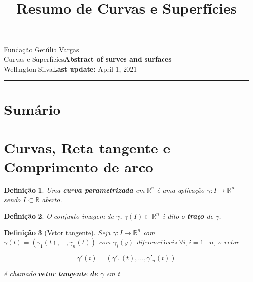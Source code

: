 \documentclass{article}
\title{Resumo de Curvas e Superfícies}
\author{}
\date{}
\newtheorem{definition}{Definição}
\newcommand{\assignment}{Abstract of surves and surfaces}
\newcommand{\duedate}{April 1, 2021}
\begin{document}
Fundação Getúlio Vargas\hfill\\
Curvas e Superfícies\hfill\textbf{\assignment}\\
Wellington Silva\hfill\textbf{Last update:} \duedate\\
\smallskip\hrule\bigskip

{\let\newpage\relax\maketitle}
\maketitle

\section*{Sumário}

\textbf{}
\vspace{4.0mm}

\textbf{}
\vspace{4.0mm}

\textbf{}
\vspace{4.0mm}

\textbf{}
\vspace{4.0mm}

\textbf{}
\vspace{4.0mm}

\textbf{}
\vspace{4.0mm}

\newpage

\section*{Curvas, Reta tangente e Comprimento de arco}
\label{s1}

\begin{definition}
Uma \textbf{curva parametrizada} em $\mathbb{R}^n$ é uma aplicação $\gamma: I \rightarrow \mathbb{R}^n$ sendo $I \subset \mathbb{R}$ aberto.
\end{definition}

\begin{definition}
O conjunto imagem de $\gamma$, $\gamma(I) \subset \mathbb{R}^n$ é dito o \textbf{traço} de $\gamma$.
\end{definition}

\begin{definition}[Vetor tangente]
Seja $\gamma: I \rightarrow \mathbb{R}^n$ com $\gamma(t) = (\gamma_1 (t), \ldots, \gamma_n (t))$ com $\gamma_i (y)$ diferenciáveis $\forall i, i = 1 \ldots n$, o vetor

$$\gamma'(t) = (\gamma'_1 (t), \ldots, \gamma'_n (t))$$

é chamado \textbf{vetor tangente de $\gamma$} em t
\end{definition}
\end{document}
